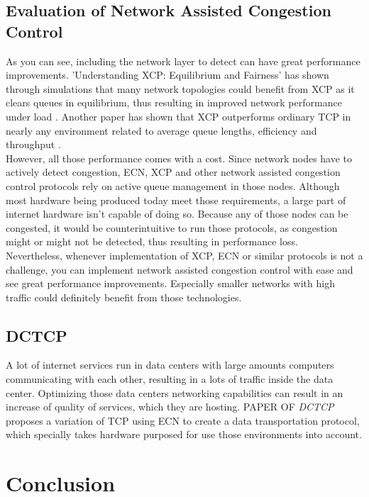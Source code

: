 \documentclass[a4paper,conference]{IEEEtran}
\begin{document}
\subsection{Evaluation of Network Assisted Congestion Control}
As you can see, including the network layer to detect can have great performance improvements. 'Understanding XCP: Equilibrium and Fairness' has shown through simulations that many network topologies could benefit from XCP as it clears queues in equilibrium, thus resulting in improved network performance under load \cite{1498331}. Another paper has shown that XCP outperforms ordinary TCP in nearly any environment related to average queue lengths, efficiency and throughput \cite{katabi2002congestion}.
\\However, all those performance comes with a cost. Since network nodes have to actively detect congestion, ECN, XCP and other network assisted congestion control protocols rely on active queue management in those nodes. Although most hardware being produced today meet those requirements, a large part of internet hardware isn't capable of doing so. Because any of those nodes can be congested, it would be counterintuitive to run those protocols, as congestion might or might not be detected, thus resulting in performance loss.
\\Nevertheless, whenever implementation of XCP, ECN or similar protocols is not a challenge, you can implement network assisted congestion control with ease and see great performance improvements. Especially smaller networks with high traffic could definitely benefit from those technologies.

\subsection{DCTCP}
A lot of internet services run in data centers with large amounts computers communicating with each other, resulting in a lots of traffic inside the data center. Optimizing those data centers networking capabilities can result in an increase of quality of services, which they are hosting. PAPER OF \textit{DCTCP} proposes a variation of TCP using ECN to create a data transportation protocol, which specially takes hardware purposed for use those environments into account.

\section{Conclusion}


\end{document}
